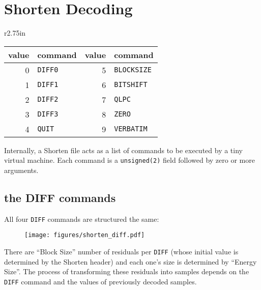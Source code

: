 \section{Shorten Decoding}
\begin{wrapfigure}[4]{r}{2.75in}
\begin{tabular}{|r|l||r|l|}
\hline
value & command & value & command \\
\hline
0 & \texttt{DIFF0} & 5 & \texttt{BLOCKSIZE} \\
1 & \texttt{DIFF1} & 6 & \texttt{BITSHIFT} \\
2 & \texttt{DIFF2} & 7 & \texttt{QLPC} \\
3 & \texttt{DIFF3} & 8 & \texttt{ZERO} \\
4 & \texttt{QUIT} & 9 & \texttt{VERBATIM} \\
\hline
\end{tabular}
\end{wrapfigure}
Internally,
a Shorten file acts as a list of commands to be executed by a tiny
virtual machine.
Each command is a \texttt{unsigned(2)} field followed by zero or more
arguments.

\subsection{the DIFF commands}
All four \texttt{DIFF} commands are structured the same:
\begin{figure}[h]
\texttt{[image: figures/shorten\_diff.pdf]}
\end{figure}
\par
\noindent
There are ``Block Size'' number of residuals per \texttt{DIFF}
(whose initial value is determined by the Shorten header)
and each one's size is determined by ``Energy Size''.
The process of transforming these residuals into samples
depends on the \texttt{DIFF} command and the values of
previously decoded samples.

